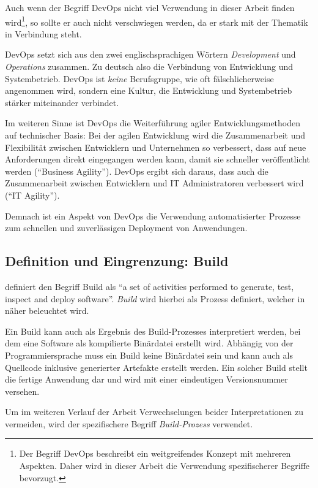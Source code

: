 Auch wenn der Begriff DevOps nicht viel Verwendung in dieser Arbeit finden wird\footnote{Der Begriff DevOps beschreibt ein weitgreifendes Konzept mit mehreren Aspekten. Daher wird in dieser Arbeit die Verwendung spezifischerer Begriffe bevorzugt.}, so sollte er auch nicht verschwiegen werden, da er stark mit der Thematik in Verbindung steht.

DevOps setzt sich aus den zwei englischsprachigen Wörtern \emph{Development} und \emph{Operations} zusammen. Zu deutsch also die Verbindung von Entwicklung und Systembetrieb. DevOps ist \emph{keine} Berufsgruppe, wie oft fälschlicherweise angenommen wird, sondern eine Kultur, die Entwicklung und Systembetrieb stärker miteinander verbindet.

Im weiteren Sinne ist DevOps die Weiterführung agiler Entwicklungsmethoden auf technischer Basis: Bei der agilen Entwicklung wird die Zusammenarbeit und Flexibilität zwischen Entwicklern und Unternehmen so verbessert, dass auf neue Anforderungen direkt eingegangen werden kann, damit sie schneller veröffentlicht werden (``Business Agility''). DevOps ergibt sich daraus, dass auch die Zusammenarbeit zwischen Entwicklern und IT Administratoren verbessert wird (``IT Agility''). \citep[4f]{Chapman2014}

Demnach ist ein Aspekt von DevOps die Verwendung automatisierter Prozesse zum schnellen und zuverlässigen Deployment von Anwendungen.

\subsection{Definition und Eingrenzung: Build}
\label{subsec:build}

\citet[27]{Duvall2007} definiert den Begriff Build als ``a set of activities performed to generate, test, inspect and deploy software''. \emph{Build} wird hierbei als Prozess definiert, welcher in  näher beleuchtet wird.

Ein Build kann auch als Ergebnis des Build-Prozesses interpretiert werden, bei dem eine Software als kompilierte Binärdatei erstellt wird. Abhängig von der Programmiersprache muss ein Build keine Binärdatei sein und kann auch als Quellcode inklusive generierter Artefakte erstellt werden. Ein solcher Build stellt die fertige Anwendung dar und wird mit einer eindeutigen Versionsnummer versehen.

Um im weiteren Verlauf der Arbeit Verwechselungen beider Interpretationen zu vermeiden, wird der spezifischere Begriff \emph{Build-Prozess} verwendet.

